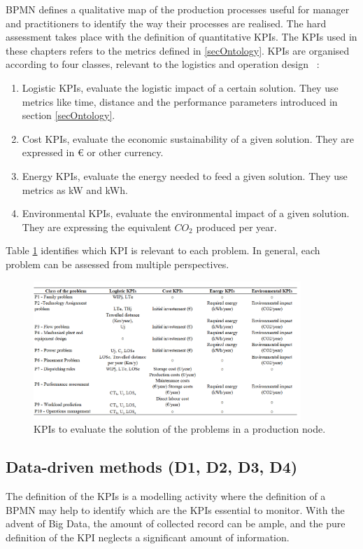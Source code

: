 BPMN defines a qualitative map of the production processes useful for manager and practitioners to identify the way their processes are realised. The hard assessment takes place with the definition of quantitative KPIs. The KPIs used in these chapters refers to the metrics defined in \ref{secOntology}. KPIs are organised according to four classes, relevant to the logistics and operation design ~\cite{Tufano2018}:

\begin{enumerate}
    \item Logistic KPIs, evaluate the logistic impact of a certain solution. They use metrics like time, distance and the performance parameters introduced in section \ref{secOntology}.
	\item Cost KPIs, evaluate the economic sustainability of a given solution. They are expressed in \euro{} or other currency.
	\item Energy KPIs, evaluate the energy needed to feed a given solution. They use metrics as kW and kWh.
	\item Environmental KPIs, evaluate the environmental impact of a given solution. They are expressing the equivalent $CO_2$ produced per year.

\end{enumerate}

Table \ref{tab_prod_KPIs} identifies which KPI is relevant to each problem. In general, each problem can be assessed from multiple perspectives.

\begin{figure}[hbt!]
\centering
\includegraphics[width=0.9\textwidth]{sectionProduction/control_figures/tab_prod_KPIs.png}
\captionsetup{type=table}
\caption{KPIs to evaluate the solution of the problems in a production node.}
\label{tab_prod_KPIs}
\end{figure}

\subsection{Data-driven methods (D1, D2, D3, D4)}
The definition of the KPIs is a modelling activity where the definition of a BPMN may help to identify which are the KPIs essential to monitor. With the advent of Big Data, the amount of collected record can be ample, and the pure definition of the KPI neglects a significant amount of information.\par

